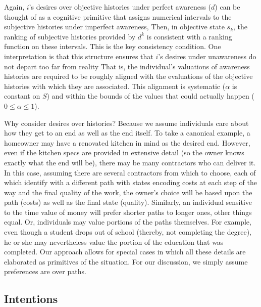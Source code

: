\documentclass[
11pt,
titlepage,
reqno,
]{article}%
\theoremstyle{definition}
\begin{document}
Again, $i$'s desires over objective histories under perfect awareness ($d$) can be thought of as a cognitive primitive that assigns numerical intervals to the subjective histories under imperfect awareness,
Then, in objective state $s_k$, the ranking of subjective histories provided by $d^k$ is consistent with a ranking function on these intervals. 
This is the key consistency condition. 
One interpretation is that this structure ensures that $i$'s desires under unawareness do not depart too far from reality
That is, the individual's valuations of awareness histories are required to be roughly aligned with the evaluations of the objective histories with which they are associated.
This alignment is systematic ($\alpha$ is constant on $S$) and within the bounds of the values that could actually happen ($0\le\alpha\le1$). 
	
Why consider desires over histories? 
Because we assume individuals care about how they get to an end as well as the end itself. 
To take a canonical example, a homeowner may have a renovated kitchen in mind as the desired end. 
However, even if the kitchen specs are provided in extensive detail (so the owner knows exactly what the end will be), there may be many contractors who can deliver it. 
In this case, assuming there are several contractors from which to choose, each of which identify with a different path with states encoding costs  at each step of the way and the final quality of the work, the owner's choice will be based upon the path (costs) as well as the final state (quality). 
Similarly, an individual sensitive to the time value of money will prefer shorter paths to longer ones, other things equal. 
Or, individuals may value portions of the paths themselves.
For example, even though a student drops out of school (thereby, not completing the degree), he or she may nevertheless value the portion of the education that was completed. 
Our approach allows for special cases in which all these details are elaborated as primitives of the situation. For our discussion, we simply assume preferences are over paths.    


	
	
\subsection{Intentions} \label{sec: intentions}
	
\end{document}
